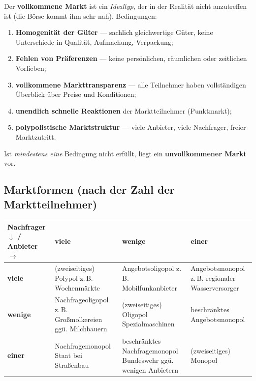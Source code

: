 \documentclass[11pt, a4paper]{article}
\begin{document}
Der \textbf{vollkommene Markt} ist ein \emph{Idealtyp}, der in der Realität nicht
anzutreffen ist (die Börse kommt ihm sehr nah). Bedingungen:

\begin{enumerate}
  \item \textbf{Homogenität der Güter} --- sachlich gleichwertige Güter, keine Unterschiede
    in Qualität, Aufmachung, Verpackung;
  \item \textbf{Fehlen von Präferenzen} --- keine persönlichen, räumlichen oder zeitlichen
    Vorlieben;
  \item \textbf{vollkommene Markttransparenz} --- alle Teilnehmer haben vollständigen
    Überblick über Preise und Konditionen;
  \item \textbf{unendlich schnelle Reaktionen} der Marktteilnehmer (Punktmarkt);
  \item \textbf{polypolistische Marktstruktur} --- viele Anbieter, viele Nachfrager, freier
    Marktzutritt.
\end{enumerate}

Ist \emph{mindestens eine} Bedingung nicht erfüllt, liegt ein \textbf{unvollkommener
Markt} vor.

\subsection{Marktformen (nach der Zahl der Marktteilnehmer)}

\begin{center}
\begin{tabular}{p{2.6cm}|p{3.6cm}|p{3.6cm}|p{3.9cm}}
\textbf{Nachfrager $\downarrow$ / Anbieter $\rightarrow$} & \textbf{viele} & \textbf{wenige} & \textbf{einer}\\
\hline
\textbf{viele} & (zweiseitiges) Polypol \newline \small z.\,B. Wochenmärkte & Angebotsoligopol \newline \small z.\,B. Mobilfunkanbieter & Angebotsmonopol \newline \small z.\,B. regionaler Wasserversorger\\
\hline
\textbf{wenige} & Nachfrageoligopol \newline \small z.\,B. Großmolkereien ggü. Milchbauern & (zweiseitiges) Oligopol \newline \small Spezialmaschinen & beschränktes Angebotsmonopol\\
\hline
\textbf{einer} & Nachfragemonopol \newline \small Staat bei Straßenbau & beschränktes Nachfragemonopol \newline \small Bundeswehr ggü. wenigen Anbietern & (zweiseitiges) Monopol\\
\end{tabular}
\end{center}
\end{document}

